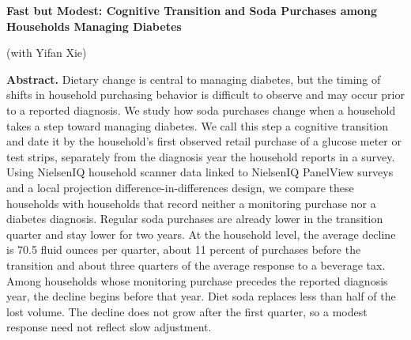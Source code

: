\documentclass[11pt]{article}
\begin{document}
\textbf{Fast but Modest: Cognitive Transition and Soda Purchases among Households Managing Diabetes} {\small (with Yifan Xie)\par}
{\small
\textbf{Abstract.} Dietary change is central to managing diabetes, but the timing of shifts in household purchasing behavior is difficult to observe and may occur prior to a reported diagnosis. We study how soda purchases change when a household takes a step toward managing diabetes. We call this step a cognitive transition and date it by the household's first observed retail purchase of a glucose meter or test strips, separately from the diagnosis year the household reports in a survey. Using NielsenIQ household scanner data linked to NielsenIQ PanelView surveys and a local projection difference-in-differences design, we compare these households with households that record neither a monitoring purchase nor a diabetes diagnosis. Regular soda purchases are already lower in the transition quarter and stay lower for two years. At the household level, the average decline is 70.5 fluid ounces per quarter, about 11 percent of purchases before the transition and about three quarters of the average response to a beverage tax. Among households whose monitoring purchase precedes the reported diagnosis year, the decline begins before that year. Diet soda replaces less than half of the lost volume. The decline does not grow after the first quarter, so a modest response need not reflect slow adjustment.\par
}

\vfill
\end{document}
